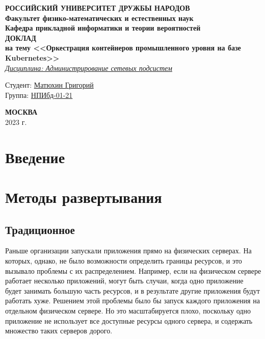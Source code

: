 \documentclass[a4page]{article}
\begin{document}
\begin{titlepage}

	\begin{center}
		\hfill \break
		\textbf{
			\large{РОССИЙСКИЙ УНИВЕРСИТЕТ ДРУЖБЫ НАРОДОВ}\\
			\normalsize{Факультет физико-математических и естественных наук}\\
			\normalsize{Кафедра прикладной информатики и теории вероятностей}\\
		}
		\vspace*{\fill}
		\Large{\textbf{ДОКЛАД\\ на тему <<Оркестрация контейнеров промышленного уровня на базе Kubernetes>>}}
		\\
		\underline{\textit{\normalsize{Дисциплина: Администрирование сетевых подсистем}}}
		\vspace*{\fill}

	\end{center}

	\begin{flushright}
		Студент: \underline{Матюхин Григорий}\\ \vspace{0.5cm}
		Группа: \underline{НПИбд-01-21}
	\end{flushright}


	\begin{center} \textbf{МОСКВА} \\ 2023 г. \end{center}
	\thispagestyle{empty} %

\end{titlepage}

\newpage

\tableofcontents

\newpage
\section{Введение}
\section{Методы развертывания}



\subsection{Традиционное}
Раньше организации запускали приложения прямо на физических серверах. На которых, однако, не было возможности определить границы ресурсов, и это вызывало проблемы с их распределением. Например, если на физическом сервере работает несколько приложений, могут быть случаи, когда одно приложение будет занимать большую часть ресурсов, и в результате другие приложения будут работать хуже. Решением этой проблемы было бы запуск каждого приложения на отдельном физическом сервере. Но это масштабируется плохо, поскольку одно приложение не использует все доступные ресурсы одного сервера, и содержать множество таких серверов дорого.
\end{document}

